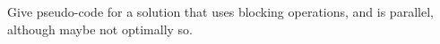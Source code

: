   Give pseudo-code for a solution that uses blocking operations, and is
  parallel, although maybe not optimally so.
